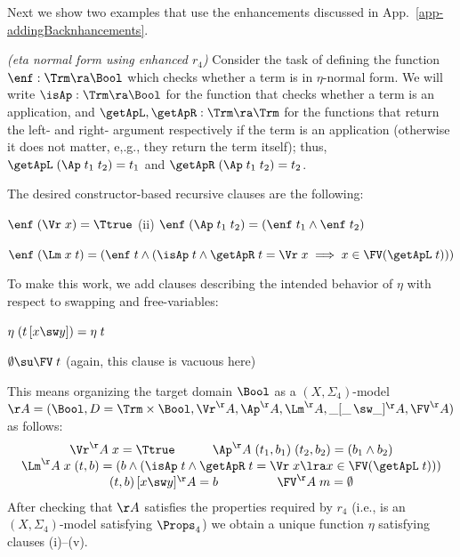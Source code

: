 Next we show two examples that use the enhancements 
discussed in App.~\ref{app-addingBacknhancements}. 

\begin{exa}\rm
		\textit{(eta normal form using enhanced $r_4$)}  \cite{primrecFOAS-Norrish04}
	Consider the task of defining the function 
$\enf : \Trm \ra \Bool$ which checks whether a term is in $\eta$-normal form. 
We will write $\isAp : \Trm \ra \Bool$ for the function that checks whether a term is an application, 
and $\getApL, \getApR : \Trm \ra \Trm$ for the functions that return the left- and right- argument 
respectively if the term is an application (otherwise it does not matter, e,.g., they return the term itself); 
thus, $\getApL\;(\Ap\;t_1\;t_2) = t_1$ and $\getApR\;(\Ap\;t_1\;t_2) = t_2$. 
 
The desired constructor-based recursive clauses are the following: 
\begin{myitem}
	\item[(i)] $\enf\;(\Vr\;x) = \Ttrue$
	\hspace*{7ex}
	(ii) $\enf\;(\Ap\;t_1\;t_2) = (\enf\;t_1 \wedge \enf\;t_2)$
	\item[(iii)] 
	$\enf\;(\Lm\;x\;t) = 
	(\enf\;t \wedge (\isAp\;t \wedge \getApR\;t = \Vr\;x \implies x \in \FV(\getApL\;t)))$
\end{myitem}
%
To make this work, we add clauses describing the intended behavior of $\eta$ with respect to swapping and free-variables: 
% 
\begin{myitem}
	\item[(iv)] $\eta\;(t\,[x\sw y]) = \eta\;t$
	\item[(v)] $\emptyset \su \FV\;t$  
	(again, this clause is vacuous here) %
\end{myitem}

This means 
organizing the target domain 
%
$\Bool$ 
as a $(X,\Sigma_4)$-model 
$\AA = (\Bool,D = \Trm \times \Bool,\Vr^\AA,\Ap^\AA,\Lm^\AA,\_[\_\,\sw \_]^\AA,\FV^\AA)$ as follows:
$$
\begin{array}{c} 
	\Vr^\AA\;x = \Ttrue  \hspace*{7ex}
	\Ap^\AA\;(t_1,b_1)\;(t_2,b_2) = (b_1 \wedge b_2) 
	\\
	\Lm^\AA\;x\;(t,b) = (b \wedge (\isAp\;t \wedge \getApR\;t = \Vr\;x \lra x \in \FV(\getApL\;t)))
	\\
	(t,b)\,[x\sw y]^\AA = b
	\hspace*{11ex}
	\FV^\AA\;m = \emptyset 
\end{array}
$$
%
After checking that $\AA$ satisfies the properties required by $r_4$ 
(i.e., is an $(X,\Sigma_4)$-model satisfying $\Props_4$) %
we obtain a unique function $\eta$ satisfying clauses (i)--(v). 
\end{exa}

